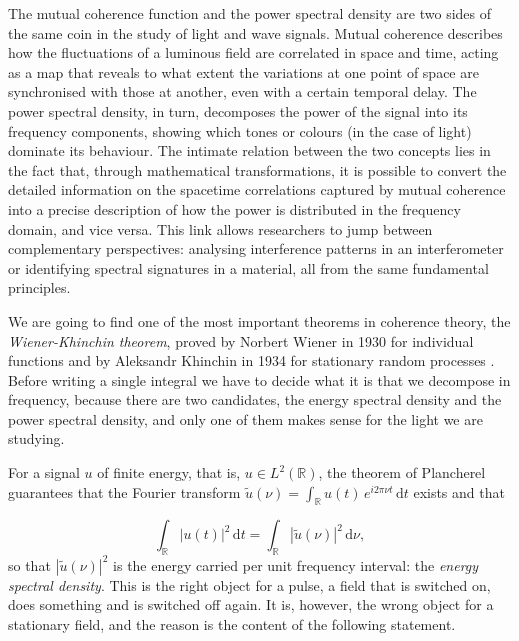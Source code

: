 		The mutual coherence function and the power spectral density are two sides of the same coin
		in the study of light and wave signals. Mutual coherence describes how the fluctuations of
		a luminous field are correlated in space and time, acting as a map that reveals to what
		extent the variations at one point of space are synchronised with those at another, even
		with a certain temporal delay. The power spectral density, in turn, decomposes the power
		of the signal into its frequency components, showing which tones or colours (in the case
		of light) dominate its behaviour. The intimate relation between the two concepts lies in
		the fact that, through mathematical transformations, it is possible to convert the detailed
		information on the spacetime correlations captured by mutual coherence into a precise
		description of how the power is distributed in the frequency domain, and vice versa. This
		link allows researchers to jump between complementary perspectives: analysing interference
		patterns in an interferometer or identifying spectral signatures in a material, all from
		the same fundamental principles.

		We are going to find one of the most important theorems in coherence theory, the
		\textit{Wiener-Khinchin theorem}, proved by Norbert Wiener in 1930 for individual
		functions \citep{wiener1930generalized} and by Aleksandr Khinchin in 1934 for stationary
		random processes \citep{khinchin1934korrelationstheorie}. Before writing a single
		integral we have to decide what it is that we decompose in frequency, because there are
		two candidates, the energy spectral density and the power spectral density, and only
		one of them makes sense for the light we are studying.

		For a signal $u$ of finite energy, that is, $u\in L^{2}(\mathbb{R})$, the theorem of
		Plancherel \citep{plancherel1910contribution} guarantees that the Fourier transform
		$\tilde{u}(\nu)=\int_{\mathbb{R}}u(t)\,e^{i2\pi\nu t}\,\mathrm{d}t$ exists and that

		\begin{equation}\label{eq:ParsevalEnergy}
			\int_{\mathbb{R}}|u(t)|^{2}\,\mathrm{d}t = \int_{\mathbb{R}}|\tilde{u}(\nu)|^{2}\,\mathrm{d}\nu ,
		\end{equation}
		so that $|\tilde{u}(\nu)|^{2}$ is the energy carried per unit frequency interval: the
		\textit{energy spectral density}. This is the right object for a pulse, a field that is
		switched on, does something and is switched off again. It is, however, the wrong object
		for a stationary field, and the reason is the content of the following statement.

